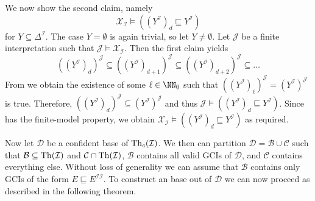 \begin{Proof}
  We now show the second claim, namely
  \begin{equation*}
    \mathcal{X}_{\mathcal{I}} \models ((Y^{\mathcal{I}})_d \sqsubseteq Y^{\mathcal{I}})
  \end{equation*}
  for $Y \subseteq \Delta^{\mathcal{I}}$.  The case $Y = \emptyset$ is again trivial, so
  let $Y \neq \emptyset$.  Let $\mathcal{J}$ be a finite interpretation such that
  $\mathcal{J} \models \mathcal{X}_{\mathcal{I}}$.  Then the first claim yields
  \begin{equation*}
    ((Y^{\mathcal{I}})_d)^{\mathcal{J}} \subseteq ((Y^{\mathcal{I}})_{d+1})^{\mathcal{J}}
    \subseteq ((Y^{\mathcal{I}})_{d+2})^{\mathcal{J}} \subseteq \dots
  \end{equation*}
  From  we obtain the existence of some $\ell \in \NN_0$ such
  that $((Y^{\mathcal{I}})_\ell)^{\mathcal{J}} = (Y^{\mathcal{I}})^{\mathcal{J}}$ is true.
  Therefore, $((Y^{\mathcal{I}})_d)^{\mathcal{J}} \subseteq
  (Y^{\mathcal{I}})^{\mathcal{J}}$ and thus $\mathcal{J} \models ((Y^{\mathcal{I}})_d
  \sqsubseteq Y^{\mathcal{I}})$.  Since \ELbot has the finite-model property, we obtain
  $\mathcal{X}_{\mathcal{I}} \models ((Y^{\mathcal{I}})_d \sqsubseteq Y^{\mathcal{I}})$ as
  required.
\end{Proof}

Now let $\mathcal{D}$ be a confident base of $\operatorname{Th}_c(\mathcal{I})$.  We then can partition
$\mathcal{D} = \mathcal{B} \cup \mathcal{C}$ such that $\mathcal{B} \subseteq
\operatorname{Th}(\mathcal{I})$ and $\mathcal{C} \cap \operatorname{Th}(\mathcal{I})$, \ie $\mathcal{B}$ contains all
valid GCIs of $\mathcal{D}$, and $\mathcal{C}$ contains everything else.  Without loss of
generality we can assume that $\mathcal{B}$ contains only GCIs of the form $E \sqsubseteq
E^{\mathcal{I}\mathcal{I}}$.  To construct an \ELbot base out of $\mathcal{D}$ we can now
proceed as described in the following theorem.

